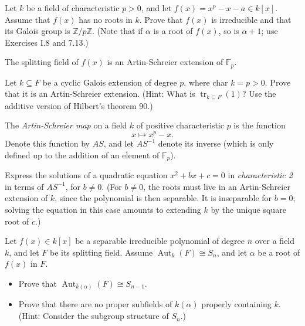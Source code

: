\documentclass[openany]{book}
\begin{document}
\begin{prob}
Let \( k \) be a field of characteristic \( p > 0 \), and let \( f(x) = x^p - x - a \in k[x] \). Assume that \( f(x) \) has no roots in \( k \). Prove that \( f(x) \) is irreducible and that its Galois group is \( \mathbb{Z}/p\mathbb{Z} \). (Note that if \( \alpha \) is a root of \( f(x) \), so is \( \alpha + 1 \); use Exercises I.8 and 7.13.)

The splitting field of \( f(x) \) is an Artin-Schreier extension of \( \mathbb{F}_p \).
\end{prob}



\begin{prob}
Let \( k \subseteq F \) be a cyclic Galois extension of degree \( p \), where char \( k = p > 0 \).  
Prove that it is an Artin-Schreier extension. (Hint: What is \( \operatorname{tr}_{k \subseteq F}(1) \)? Use the additive version of Hilbert's theorem 90.)
\end{prob}

\begin{prob}
The \emph{Artin-Schreier map} on a field \( k \) of positive characteristic \( p \) is the function  
\[x \mapsto x^p - x.\]  
Denote this function by \( \mathit{AS} \), and let \( \mathit{AS}^{-1} \) denote its inverse (which is only defined up to the addition of an element of \( \mathbb{F}_p \)).

Express the solutions of a quadratic equation \( x^2 + bx + c = 0 \) in \emph{characteristic 2} in terms of \( \mathit{AS}^{-1} \), for \( b \neq 0 \). (For \( b \neq 0 \), the roots must live in an Artin-Schreier extension of \( k \), since the polynomial is then separable. It is inseparable for \( b = 0 \); solving the equation in this case amounts to extending \( k \) by the unique square root of \( c \).)
\end{prob}

\begin{prob}
Let \( f(x) \in k[x] \) be a separable irreducible polynomial of degree \( n \) over a field \( k \), and let \( F \) be its splitting field. Assume \( \operatorname{Aut}_{k}(F) \cong S_n \), and let \( \alpha \) be a root of \( f(x) \) in \( F \).  

\begin{itemize}
    \item Prove that \( \operatorname{Aut}_{k(\alpha)}(F) \cong S_{n-1} \).  
    \item Prove that there are no proper subfields of \( k(\alpha) \) properly containing \( k \). (Hint: Consider the subgroup structure of \( S_n \).)
\end{itemize}
\end{prob}
\end{document}
